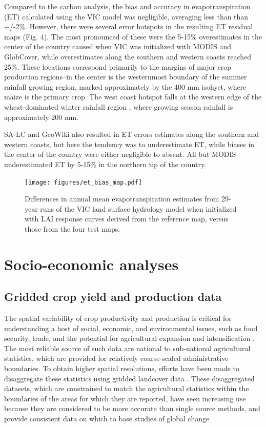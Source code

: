 \documentclass{pnastwo2}
\begin{document}
\begin{article}
Compared to the carbon analysis, the bias and accuracy in evapotranspiration (ET) calculated using the VIC model was negligible, averaging less than than +/-2\%. However, there were several error hotspots in the resulting ET residual maps (Fig. 4). The most pronounced of these were the 5-15\% overestimates in the center of the country caused when VIC was initialized with MODIS and GlobCover, while overestimates along the southern and western coasts reached 25\%. These locations correspond primarily to the margins of major crop production regions--in the center is the westernmost boundary of the summer rainfall growing region, marked approximately by the 400 mm isohyet, where maize is the primary crop. The west coast hotspot falls at the western edge of the wheat-dominated winter rainfall region \cite{hardy_rainfed_2011}, where growing season rainfall is approximately 200 mm. 

SA-LC and GeoWiki also resulted in ET errors estimates along the southern and western coasts, but here the tendency was to underestimate ET, while biases in the center of the country were either negligible to absent.  All but MODIS underestimated ET by 5-15\% in the northern tip of the country.  

\begin{figure}[h]
\centerline{\texttt{[image: figures/et\_bias\_map.pdf]}}
\caption{Differences in annual mean evapotranspiration estimates from 29-year runs of the VIC land surface hydrology model when initialized with LAI response curves derived from the reference map, versus those from the four test maps.}\label{afoto}
\end{figure}

\section{Socio-economic analyses}
\subsection{Gridded crop yield and production data}
The spatial variability of crop productivity and production is critical for understanding a host of social, economic, and environmental issues, such as food security, trade, and the potential for agricultural expansion and intensification \cite{licker_mind_2010,monfreda_farming_2008}. The most reliable source of such data are national to sub-national agricultural statistics, which are provided for relatively coarse-scaled administrative boundaries. To obtain higher spatial resolutions, efforts have been made to disaggregate these statistics using gridded landcover data \cite{ramankutty_farming_2008,monfreda_farming_2008}. These disaggregated datasets, which are constrained to match the agricultural statistics within the boundaries of the areas for which they are reported, have seen increasing use because they are considered to be more accurate than single source methods, and provide consistent data on which to base studies of global change \cite{ramankutty_farming_2008, see_improved_2015}


\end{article}
\end{document}
